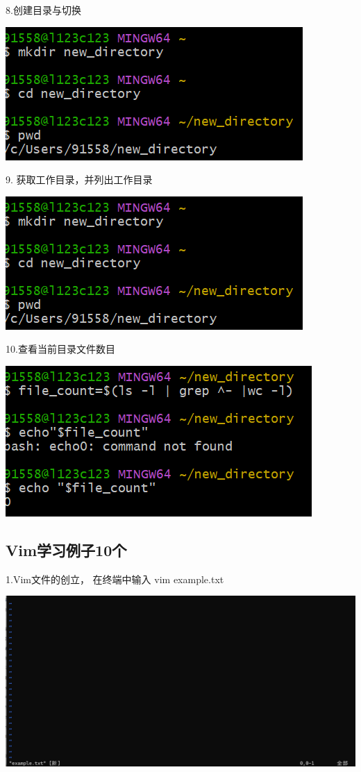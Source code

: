 \documentclass{article}
\begin{document}
8.创建目录与切换

\noindent
\begin{minipage}{\linewidth}
 \centering
  \includegraphics[width=0.5\linewidth]{mkdir.png}
  \label{fig:example}
\end{minipage}

9. 获取工作目录，并列出工作目录

\begin{minipage}{\linewidth}
    \centering
     \includegraphics[width=0.5\linewidth]{mkdir.png}
     \label{fig:example}
\end{minipage}


10.查看当前目录文件数目

\noindent
\begin{minipage}{\linewidth}
 \centering
  \includegraphics[width=0.5\linewidth]{file_count.png}
  \label{fig:example}
\end{minipage}



\subsection{Vim学习例子10个}
1.Vim文件的创立，
在终端中输入 vim example.txt


\noindent
\begin{minipage}{\linewidth}
  \centering
  \includegraphics[width=0.5\linewidth]{vim1.png}
  \label{fig:example}
\end{minipage}
\end{document}
